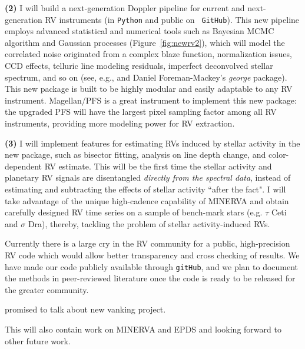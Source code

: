 {\bf (2)} I will build a next-generation Doppler pipeline for current
and next-generation RV instruments (in {\tt Python} and public on {\tt
  GitHub}). This new pipeline employs advanced statistical and
numerical tools such as Bayesian MCMC algorithm and Gaussian processes
(Figure~\ref{fig:newrv2}), which will model the correlated noise
originated from a complex blaze function, normalization issues, CCD
effects, telluric line modeling residuals, imperfect deconvolved
stellar spectrum, and so on (see, e.g., \citealt{starfish} and Daniel
Foreman-Mackey's {\it george} package). This new package is built to
be highly modular and easily adaptable to any RV
instrument. Magellan/PFS is a great instrument to implement this new
package: the upgraded PFS will have the largest pixel sampling factor
among all RV instruments, providing more modeling power for RV
extraction.

{\bf (3)} I will implement features for estimating RVs induced by
stellar activity in the new package, such as bisector fitting,
analysis on line depth change, and color-dependent RV estimate. This
will be the first time the stellar activity and planetary RV signals
are disentangled {\it directly from the spectral data}, instead of
estimating and subtracting the effects of stellar activity ``after the
fact". I will take advantage of the unique high-cadence capability of
MINERVA and obtain carefully designed RV time series on a sample of
bench-mark stars (e.g. $\tau$ Ceti and $\sigma$ Dra), thereby,
tackling the problem of stellar activity-induced RVs.


Currently there is a large cry in the RV community for a public,
high-precision RV code which would allow better transparency and cross
checking of results. We have made our code publicly available through
{\tt gitHub}, and we plan to document the methods in peer-reviewed
literature once the code is ready to be released for the greater
community.

promised to talk about new vanking project.




This will also contain work on MINERVA and EPDS and looking forward to
other future work.



